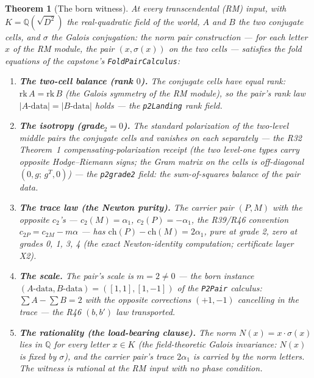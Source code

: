 \documentclass[11pt]{article}
\newtheorem{theorem}{Theorem}
\theoremstyle{definition}
\begin{document}
\begin{theorem}[The born witness]\label{thm:witness}
At every transcendental (RM) input, with $K=\mathbb{Q}(\sqrt{D^2})$ the
real-quadratic field of the world, $A$ and $B$ the two conjugate cells,
and $\sigma$ the Galois conjugation: the \emph{norm pair} construction
--- for each letter $x$ of the RM module, the pair $(x,\sigma(x))$ on
the two cells --- satisfies the fold equations of the capstone's
\texttt{FoldPairCalculus}:
\begin{enumerate}[label=(\roman*)]
\item \textbf{The two-cell balance (rank $0$).} The conjugate cells have
equal rank: $\mathrm{rk}\,A=\mathrm{rk}\,B$ (the Galois symmetry of the
RM module), so the pair's rank law $|A\text{-data}|=|B\text{-data}|$
holds --- the \texttt{p2Landing} rank field.
\item \textbf{The isotropy (grade$_2=0$).} The standard polarization of
the two-level middle pairs the conjugate cells and vanishes on each
separately --- the R32 Theorem~1 compensating-polarization receipt (the
two level-one types carry opposite Hodge--Riemann signs; the Gram matrix
on the cells is off-diagonal $(0,g;\,g^{T},0)$) --- the
\texttt{p2grade2} field: the sum-of-squares balance of the pair data.
\item \textbf{The trace law (the Newton purity).} The carrier pair
$(P,M)$ with the \emph{opposite} $c_2$'s --- $c_2(M)=\alpha_1$,
$c_2(P)=-\alpha_1$, the R39/R46 convention $c_{2P}=c_{2M}-m\alpha$ ---
has
$\mathrm{ch}(P)-\mathrm{ch}(M)=2\alpha_1$, \emph{pure at grade 2, zero
at grades 0, 1, 3, 4} (the exact Newton-identity computation; certificate
layer X2).
\item \textbf{The scale.} The pair's scale is $m=2\neq0$ --- the born
instance $(A\text{-data},B\text{-data})=([1,1],[1,-1])$ of the
\texttt{P2Pair} calculus: $\sum A-\sum B=2$ with the opposite
corrections $(+1,-1)$ cancelling in the trace --- the R46 $(b,b')$ law
transported.
\item \textbf{The rationality (the load-bearing clause).} The norm
$N(x)=x\cdot\sigma(x)$ lies in $\mathbb{Q}$ for every letter $x\in K$
(the field-theoretic Galois invariance: $N(x)$ is fixed by $\sigma$),
and the carrier pair's trace $2\alpha_1$ is carried by the norm letters.
\emph{The witness is rational at the RM input with no phase condition.}
\end{enumerate}
\end{theorem}
\end{document}
